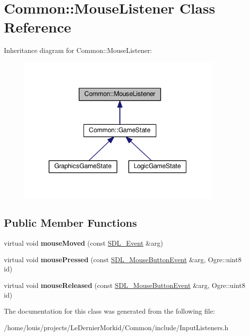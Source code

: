 \hypertarget{class_common_1_1_mouse_listener}{}\section{Common\+:\+:Mouse\+Listener Class Reference}
\label{class_common_1_1_mouse_listener}


Inheritance diagram for Common\+:\+:Mouse\+Listener\+:\nopagebreak
\begin{figure}[H]
\begin{center}
\leavevmode
\includegraphics[width=292pt]{class_common_1_1_mouse_listener__inherit__graph}
\end{center}
\end{figure}
\subsection*{Public Member Functions}
\begin{DoxyCompactItemize}
\item 
\mbox{\label{class_common_1_1_mouse_listener_a5c61cd1a790d55852a647235371fa5ee}} 
virtual void {\bfseries mouse\+Moved} (const \hyperlink{union_s_d_l___event}{S\+D\+L\+\_\+\+Event} \&arg)
\item 
\mbox{\label{class_common_1_1_mouse_listener_a5b62c0b51cdb3a99ea099c72fb2fa767}} 
virtual void {\bfseries mouse\+Pressed} (const \hyperlink{struct_s_d_l___mouse_button_event}{S\+D\+L\+\_\+\+Mouse\+Button\+Event} \&arg, Ogre\+::uint8 id)
\item 
\mbox{\label{class_common_1_1_mouse_listener_a820334fbe8a5094938512ebe13965fdc}} 
virtual void {\bfseries mouse\+Released} (const \hyperlink{struct_s_d_l___mouse_button_event}{S\+D\+L\+\_\+\+Mouse\+Button\+Event} \&arg, Ogre\+::uint8 id)
\end{DoxyCompactItemize}


The documentation for this class was generated from the following file\+:\begin{DoxyCompactItemize}
\item 
/home/louis/projects/\+Le\+Dernier\+Morkid/\+Common/include/Input\+Listeners.\+h\end{DoxyCompactItemize}
